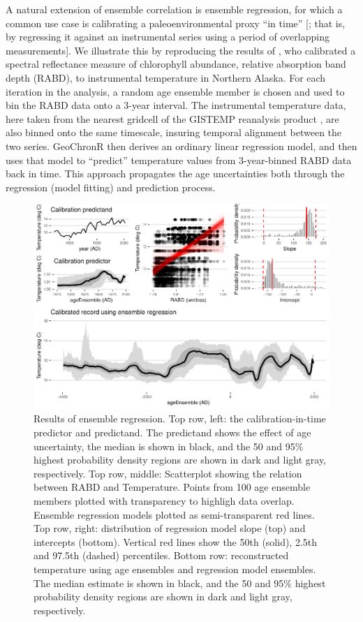 \documentclass[gchron, manuscript]{copernicus}
\begin{document}
A natural extension of ensemble correlation is ensemble regression, for which a common use case is calibrating a paleoenvironmental proxy ``in time'' {[}\citet{grosjean2009calibration}; that is, by regressing it against an instrumental series using a period of overlapping measurements{]}. We illustrate this by reproducing the results of \citet{Boldt2015}, who calibrated a spectral reflectance measure of chlorophyll abundance, relative absorption band depth (RABD), to instrumental temperature in Northern Alaska.
For each iteration in the analysis, a random age ensemble member is chosen and used to bin the RABD data onto a 3-year interval.
The instrumental temperature data, here taken from the nearest gridcell of the GISTEMP reanalysis product \citep{hansen2010global}, are also binned onto the same timescale, insuring temporal alignment between the two series.
GeoChronR then derives an ordinary linear regression model, and then uses that model to ``predict'' temperature values from 3-year-binned RABD data back in time.
This approach propagates the age uncertainties both through the regression (model fitting) and prediction process.

\begin{figure}
\includegraphics[width=12cm]{geoChronR-paper_files/figure-latex/regression-1} \caption{Results of ensemble regression. Top row, left: the calibration-in-time predictor and predictand. The predictand shows the effect of age uncertainty, the median is shown in black, and the 50 and 95\% highest probability density regions are shown in dark and light gray, respectively. Top row, middle: Scatterplot showing the relation between RABD and Temperature. Points from 100 age ensemble members plotted with transparency to highligh data overlap. Ensemble regression models plotted as semi-transparent red lines. Top row, right: distribution of regression model slope (top) and intercepts (bottom). Vertical red lines show the 50th (solid), 2.5th and 97.5th (dashed) percentiles. Bottom row: reconstructed temperature using age ensembles and regression model ensembles. The median estimate is shown in black, and the 50 and 95\% highest probability density regions are shown in dark and light gray, respectively.}\label{fig:regression}
\end{figure}
\end{document}
